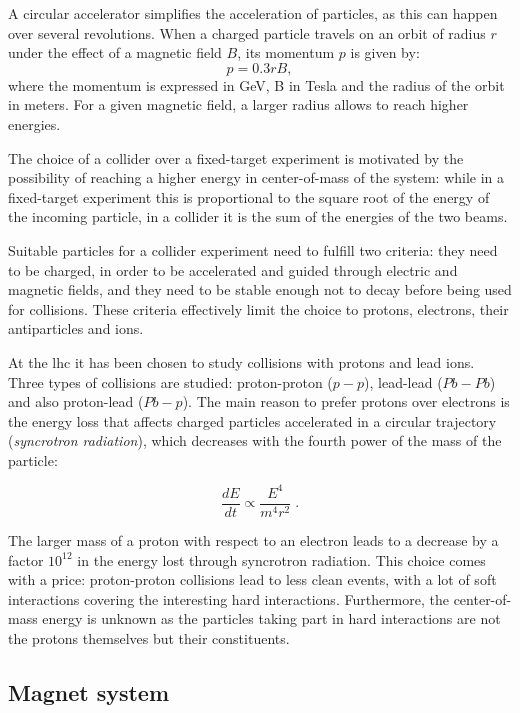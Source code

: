 A circular accelerator simplifies the acceleration of particles, as this can happen over several revolutions. When a charged particle travels on an orbit of radius $r$ under the effect of a magnetic field $B$, its momentum $p$ is given by:
\begin{equation}
\label{eq:cern:p03br}
p = 0.3 r B,
\end{equation}
\noindent where the momentum is expressed in GeV, B in Tesla and the radius of the orbit in meters. For a given magnetic field, a larger radius allows to reach higher energies. 

The choice of a collider over a fixed-target experiment is motivated by the possibility of reaching a higher energy in center-of-mass of the system: while in a fixed-target experiment this is proportional to the square root of the energy of the incoming particle, in a collider it is the sum of the energies of the two beams.


Suitable particles for a collider experiment need to fulfill two criteria: they need to be charged, in order to be accelerated and guided through electric and magnetic fields, and they need to be stable enough not to decay before being used for collisions. These criteria effectively limit the choice to protons, electrons, their antiparticles and ions. 

At the \gls{lhc} it has been chosen to study collisions with protons and lead ions. Three types of collisions are studied: proton-proton ($p-p$), lead-lead ($Pb-Pb$) and also proton-lead ($Pb-p$). The main reason to prefer protons over electrons is the energy loss that affects charged particles accelerated in a circular trajectory (\textit{syncrotron radiation}), which decreases with the fourth power of the mass of the particle:

\begin{equation}
\label{eq:cern:sync}
\frac{dE}{dt} \propto \frac{E^4}{m^4 r^2} \; .
\end{equation}

The larger mass of a proton with respect to an electron leads to a decrease by a factor $10^{12}$ in the energy lost through syncrotron radiation. This choice comes with a price: proton-proton collisions lead to less clean events, with a lot of soft interactions covering the interesting hard interactions. Furthermore, the center-of-mass energy is unknown as the particles taking part in hard interactions are not the protons themselves but their constituents.

\subsection{Magnet system} 


